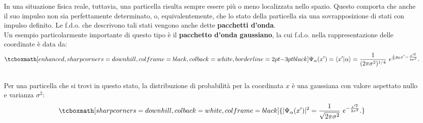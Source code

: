 \documentclass[a4paper,12pt,oneside]{book}
\begin{document}
In una situazione fisica reale, tuttavia, una particella risulta sempre essere più o meno localizzata nello spazio. Questo comporta che anche il suo impulso non sia perfettamente determinato, o, equivalentemente, che lo stato della particella sia una sovrapposizione di stati con impulso definito. Le f.d.o. che descrivono tali stati vengono anche dette \textbf{pacchetti d'onda}.\\

Un esempio particolarmente importante di questo tipo è il \textbf{pacchetto d'onda gaussiano}, la cui f.d.o. nella rappresentazione delle coordinate è data da:
	\begin{equation}
		\tcboxmath[enhanced, sharp corners=downhill, colframe=black, colback=white, borderline={2pt}{-3pt}{black}]{
			\Psi_\alpha (x') = \langle x' | \alpha \rangle = \frac{1}{(2 \pi \sigma^2)^{1/4}}~  e^{\frac{i}{\hbar}p_0 x' - \frac{x'^2}{4 \sigma^2}}.
			}
	\end{equation}\\
	
Per una particella che si trovi in questo stato, la distribuzione di probabilità per la coordinata $x$ è una gaussiana con valore aspettato nullo e varianza $\sigma^2$:
	\begin{equation}
		\tcboxmath[sharp corners=downhill, colback=white, colframe=black]{
			|\Psi_\alpha (x')|^2 = \frac{1}{\sqrt{2 \pi \sigma^2}}~   e^{- \frac{x'^2}{2 \sigma^2}}.
			}
	\end{equation}\\
	
\end{document}
